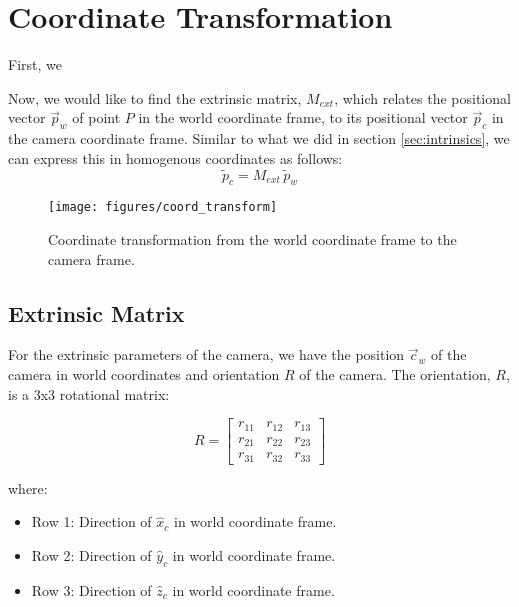 \section{Coordinate Transformation} \label{sec:extrinsics}

First, we 

Now, we would like to find the extrinsic matrix, $M_{ext}$, which relates the positional vector $\vec{p}_w$ of point $P$ in the world coordinate frame, to its positional vector $\vec{p}_c$ in the camera coordinate frame. Similar to what we did in section \ref{sec:intrinsics}, we can express this in homogenous coordinates as follows:
\begin{equation} \label{eq:pc}
    \widetilde{p}_c =  M_{ext}\,\widetilde{p}_w
\end{equation}

\begin{figure}[H]
    \centering
    \texttt{[image: figures/coord\_transform]}
    \caption{Coordinate transformation from the world coordinate frame to the camera frame.}
\end{figure}

\subsection{Extrinsic Matrix}

For the extrinsic parameters of the camera, we have the position $\vec{c}_w$ of the camera in world coordinates and orientation $R$ of the camera. The orientation, $R$, is a 3x3 rotational matrix: 

\begin{equation}
    R = 
    \begin{bmatrix}
        r_{11} & r_{12} & r_{13} \\
        r_{21} & r_{22} & r_{23} \\
        r_{31} & r_{32} & r_{33}
    \end{bmatrix}
\end{equation}

\noindent where:
\begin{itemize}
    \item Row 1: Direction of $\hat{x}_c$ in world coordinate frame.
    \item Row 2: Direction of $\hat{y}_c$ in world coordinate frame.
    \item Row 3: Direction of $\hat{z}_c$ in world coordinate frame.
\end{itemize}

